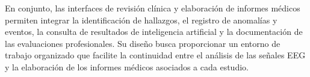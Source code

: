 En conjunto, las interfaces de revisión clínica y elaboración de informes médicos permiten integrar la identificación de hallazgos, el registro de anomalías y eventos, la consulta de resultados de inteligencia artificial y la documentación de las evaluaciones profesionales. Su diseño busca proporcionar un entorno de trabajo organizado que facilite la continuidad entre el análisis de las señales EEG y la elaboración de los informes médicos asociados a cada estudio.